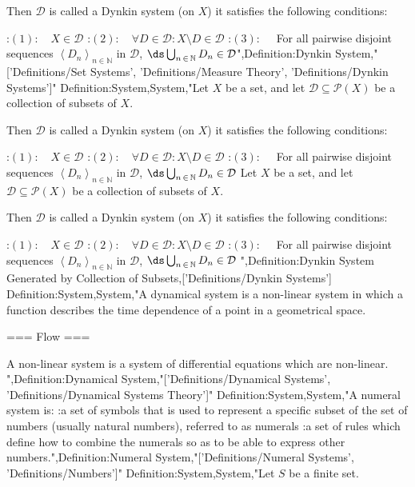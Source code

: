 Then $\mathcal D$ is called a Dynkin system (on $X$)  it satisfies the following conditions:

:$(1): \quad X \in \mathcal D$
:$(2): \quad \forall D \in \mathcal D: X \setminus D \in \mathcal D$
:$(3): \quad$ For all pairwise disjoint sequences $\left\langle D_n \right\rangle_{n \mathop \in \mathbb N}$ in $\mathcal D$, $\ds \bigcup_{n \mathop \in \mathbb N} D_n \in \mathcal D$",Definition:Dynkin System,"['Definitions/Set Systems', 'Definitions/Measure Theory', 'Definitions/Dynkin Systems']"
Definition:System,System,"Let $X$ be a set, and let $\mathcal D \subseteq \mathcal P \left( X \right)$ be a collection of subsets of $X$.


Then $\mathcal D$ is called a Dynkin system (on $X$)  it satisfies the following conditions:

:$(1): \quad X \in \mathcal D$
:$(2): \quad \forall D \in \mathcal D: X \setminus D \in \mathcal D$
:$(3): \quad$ For all pairwise disjoint sequences $\left\langle D_n \right\rangle_{n \mathop \in \mathbb N}$ in $\mathcal D$, $\ds \bigcup_{n \mathop \in \mathbb N} D_n \in \mathcal D$
Let $X$ be a set, and let $\mathcal D \subseteq \mathcal P \left( X \right)$ be a collection of subsets of $X$.


Then $\mathcal D$ is called a Dynkin system (on $X$)  it satisfies the following conditions:

:$(1): \quad X \in \mathcal D$
:$(2): \quad \forall D \in \mathcal D: X \setminus D \in \mathcal D$
:$(3): \quad$ For all pairwise disjoint sequences $\left\langle D_n \right\rangle_{n \mathop \in \mathbb N}$ in $\mathcal D$, $\ds \bigcup_{n \mathop \in \mathbb N} D_n \in \mathcal D$
",Definition:Dynkin System Generated by Collection of Subsets,['Definitions/Dynkin Systems']
Definition:System,System,"A dynamical system is a non-linear system in which a function describes the time dependence of a point in a geometrical space.


=== Flow ===

A non-linear system is a system of differential equations which are non-linear.
",Definition:Dynamical System,"['Definitions/Dynamical Systems', 'Definitions/Dynamical Systems Theory']"
Definition:System,System,"A numeral system is:
:a set of symbols that is used to represent a specific subset of the set of numbers (usually natural numbers), referred to as numerals
:a set of rules which define how to combine the numerals so as to be able to express other numbers.",Definition:Numeral System,"['Definitions/Numeral Systems', 'Definitions/Numbers']"
Definition:System,System,"Let $S$ be a finite set.

